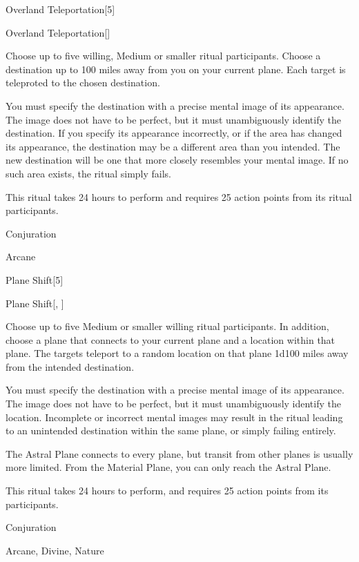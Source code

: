 \begin{spellsection}{Overland Teleportation}[5]


\begin{ability}{Overland Teleportation}[]

Choose up to five willing, Medium or smaller ritual participants.
Choose a destination up to 100 miles away from you on your current plane.
Each target is teleproted to the chosen destination.

You must specify the destination with a precise mental image of its appearance.
The image does not have to be perfect, but it must unambiguously identify the destination.
If you specify its appearance incorrectly, or if the area has changed its appearance, the destination may be a different area than you intended.
The new destination will be one that more closely resembles your mental image.
If no such area exists, the ritual simply fails.

This ritual takes 24 hours to perform and requires 25 action points from its ritual participants.

\end{ability}




 Conjuration

 Arcane
\end{spellsection}


\begin{spellsection}{Plane Shift}[5]


\begin{ability}{Plane Shift}[, ]

Choose up to five Medium or smaller willing ritual participants.
In addition, choose a plane that connects to your current plane and a location within that plane.
The targets teleport to a random location on that plane 1d100 miles away from the intended destination.

You must specify the destination with a precise mental image of its appearance.
The image does not have to be perfect, but it must unambiguously identify the location.
Incomplete or incorrect mental images may result in the ritual leading to an unintended destination within the same plane, or simply failing entirely.

The Astral Plane connects to every plane, but transit from other planes is usually more limited.
From the Material Plane, you can only reach the Astral Plane.

This ritual takes 24 hours to perform, and requires 25 action points from its participants.

\end{ability}




 Conjuration

 Arcane, Divine, Nature
\end{spellsection}


